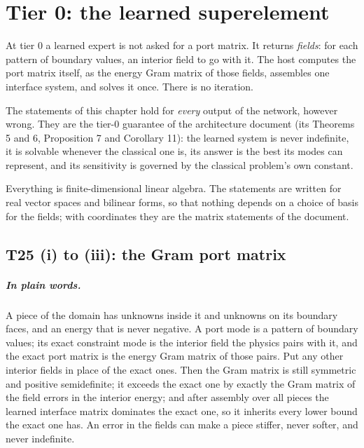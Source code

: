 \chapter{Tier 0: the learned superelement}

At tier 0 a learned expert is not asked for a port matrix.  It returns
\emph{fields}: for each pattern of boundary values, an interior field to go
with it.  The host computes the port matrix itself, as the energy Gram matrix
of those fields, assembles one interface system, and solves it once.  There is
no iteration.

The statements of this chapter hold for \emph{every} output of the network,
however wrong.  They are the tier-0 guarantee of the architecture document
(its Theorems 5 and 6, Proposition 7 and Corollary 11): the learned system is
never indefinite, it is solvable whenever the classical one is, its answer is
the best its modes can represent, and its sensitivity is governed by the
classical problem's own constant.

Everything is finite-dimensional linear algebra.  The statements are written
for real vector spaces and bilinear forms, so that nothing depends on a choice
of basis for the fields; with coordinates they are the matrix statements of the
document.

\section{T25 (i) to (iii): the Gram port matrix}

\paragraph{In plain words.}
A piece of the domain has unknowns inside it and unknowns on its boundary
faces, and an energy that is never negative.  A port mode is a pattern of
boundary values; its exact constraint mode is the interior field the physics
pairs with it, and the exact port matrix is the energy Gram matrix of those
pairs.  Put any other interior fields in place of the exact ones.  Then the
Gram matrix is still symmetric and positive semidefinite; it exceeds the exact
one by exactly the Gram matrix of the field errors in the interior energy; and
after assembly over all pieces the learned interface matrix dominates the exact
one, so it inherits every lower bound the exact one has.  An error in the
fields can make a piece stiffer, never softer, and never indefinite.

